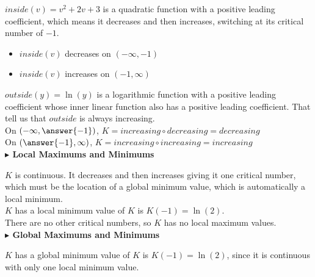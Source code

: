 \documentclass{ximera}
\begin{document}
\begin{example}
$inside(v) = v^2 + 2v + 3$ is a quadratic function with a positive leading coefficient, which means it decreases and then increases, switching at its critical number of $-1$. \\

\begin{itemize}
\item $inside(v)$ decreases on $(-\infty, -1)$ \\
\item $inside(v)$ increases on $(-1, \infty)$ 
\end{itemize}




$outside(y) = \ln(y)$ is a logarithmic function with a positive leading coefficient whose inner linear function also has a positive leading coefficient. That tell us that $outside$ is always increasing. \\


On $\left( -\infty, \answer{-1} \right)$, $K = increasing \circ decreasing = decreasing$\\


On $\left( \answer{-1}, \infty \right)$, $K = increasing \circ increasing = increasing$\\









\textbf{\textcolor{blue!55!black}{$\blacktriangleright$ Local Maximums and Minimums}} 


$K$ is continuous.  It decreases and then increases giving it one critical number, which must be the location of a global minimum value, which is automatically a local minimum. \\

$K$ has a local minimum value of $K$ is $K(-1) = \ln(2)$. \\


There are no other critical numbers, so $K$ has no local maximum values. \\






\textbf{\textcolor{blue!55!black}{$\blacktriangleright$ Global Maximums and Minimums}} 


$K$ has a global minimum value of $K$ is $K(-1) = \ln(2)$, since it is continuous with only one local minimum value. \\





\end{example}
\end{document}
